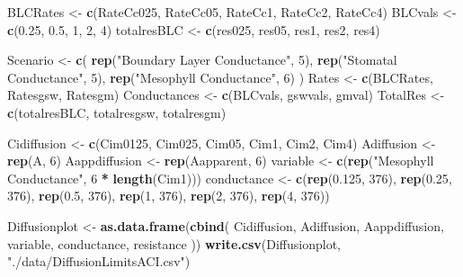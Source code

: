 \documentclass[
]{krantz}
\makeatletter
\newenvironment{Shaded}{\begin{snugshade}}{\end{snugshade}}
\newcommand{\DecValTok}[1]{\textcolor[rgb]{0.00,0.00,0.81}{#1}}
\newcommand{\FloatTok}[1]{\textcolor[rgb]{0.00,0.00,0.81}{#1}}
\newcommand{\KeywordTok}[1]{\textcolor[rgb]{0.13,0.29,0.53}{\textbf{#1}}}
\newcommand{\NormalTok}[1]{#1}
\newcommand{\OperatorTok}[1]{\textcolor[rgb]{0.81,0.36,0.00}{\textbf{#1}}}
\newcommand{\StringTok}[1]{\textcolor[rgb]{0.31,0.60,0.02}{#1}}
\newenvironment{kframe}{%
\medskip{}
\setlength{\fboxsep}{.8em}
 \def\at@end@of@kframe{}%
 \ifinner\ifhmode%
  \def\at@end@of@kframe{\end{minipage}}%
  \begin{minipage}{\columnwidth}%
 \fi\fi%
 \def\FrameCommand##1{\hskip\@totalleftmargin \hskip-\fboxsep
 \colorbox{shadecolor}{##1}\hskip-\fboxsep
     \hskip-\linewidth \hskip-\@totalleftmargin \hskip\columnwidth}%
 \MakeFramed {\advance\hsize-\width
   \@totalleftmargin\z@ \linewidth\hsize
   \@setminipage}}%
 {\par\unskip\endMakeFramed%
 \at@end@of@kframe}
\renewenvironment{Shaded}{\begin{kframe}}{\end{kframe}}
\makeatother
\begin{document}
\begin{Shaded}
\begin{Highlighting}[]
\NormalTok{BLCRates \textless{}{-}}\StringTok{ }\KeywordTok{c}\NormalTok{(RateCc025, RateCc05, RateCc1, RateCc2, RateCc4)}
\NormalTok{BLCvals \textless{}{-}}\StringTok{ }\KeywordTok{c}\NormalTok{(}\FloatTok{0.25}\NormalTok{, }\FloatTok{0.5}\NormalTok{, }\DecValTok{1}\NormalTok{, }\DecValTok{2}\NormalTok{, }\DecValTok{4}\NormalTok{)}
\NormalTok{totalresBLC \textless{}{-}}\StringTok{ }\KeywordTok{c}\NormalTok{(res025, res05, res1, res2, res4)}

\NormalTok{Scenario \textless{}{-}}
\StringTok{  }\KeywordTok{c}\NormalTok{(}
    \KeywordTok{rep}\NormalTok{(}\StringTok{"Boundary Layer Conductance"}\NormalTok{, }\DecValTok{5}\NormalTok{),}
    \KeywordTok{rep}\NormalTok{(}\StringTok{"Stomatal Conductance"}\NormalTok{, }\DecValTok{5}\NormalTok{),}
    \KeywordTok{rep}\NormalTok{(}\StringTok{"Mesophyll Conductance"}\NormalTok{, }\DecValTok{6}\NormalTok{)}
\NormalTok{  )}
\NormalTok{Rates \textless{}{-}}\StringTok{ }\KeywordTok{c}\NormalTok{(BLCRates, Ratesgsw, Ratesgm)}
\NormalTok{Conductances \textless{}{-}}\StringTok{ }\KeywordTok{c}\NormalTok{(BLCvals, gswvals, gmval)}
\NormalTok{TotalRes \textless{}{-}}\StringTok{ }\KeywordTok{c}\NormalTok{(totalresBLC, totalresgsw, totalresgm)}

\NormalTok{Cidiffusion \textless{}{-}}\StringTok{ }\KeywordTok{c}\NormalTok{(Cim0125, Cim025, Cim05, Cim1, Cim2, Cim4)}
\NormalTok{Adiffusion \textless{}{-}}\StringTok{ }\KeywordTok{rep}\NormalTok{(A, }\DecValTok{6}\NormalTok{)}
\NormalTok{Aappdiffusion \textless{}{-}}\StringTok{ }\KeywordTok{rep}\NormalTok{(Aapparent, }\DecValTok{6}\NormalTok{)}
\NormalTok{variable \textless{}{-}}\StringTok{ }\KeywordTok{c}\NormalTok{(}\KeywordTok{rep}\NormalTok{(}\StringTok{"Mesophyll Conductance"}\NormalTok{, }\DecValTok{6} \OperatorTok{*}\StringTok{ }\KeywordTok{length}\NormalTok{(Cim1)))}
\NormalTok{conductance \textless{}{-}}
\StringTok{  }\KeywordTok{c}\NormalTok{(}\KeywordTok{rep}\NormalTok{(}\FloatTok{0.125}\NormalTok{, }\DecValTok{376}\NormalTok{),}
    \KeywordTok{rep}\NormalTok{(}\FloatTok{0.25}\NormalTok{, }\DecValTok{376}\NormalTok{),}
    \KeywordTok{rep}\NormalTok{(}\FloatTok{0.5}\NormalTok{, }\DecValTok{376}\NormalTok{),}
    \KeywordTok{rep}\NormalTok{(}\DecValTok{1}\NormalTok{, }\DecValTok{376}\NormalTok{),}
    \KeywordTok{rep}\NormalTok{(}\DecValTok{2}\NormalTok{, }\DecValTok{376}\NormalTok{),}
    \KeywordTok{rep}\NormalTok{(}\DecValTok{4}\NormalTok{, }\DecValTok{376}\NormalTok{))}


\NormalTok{Diffusionplot \textless{}{-}}
\StringTok{  }\KeywordTok{as.data.frame}\NormalTok{(}\KeywordTok{cbind}\NormalTok{(}
\NormalTok{    Cidiffusion,}
\NormalTok{    Adiffusion,}
\NormalTok{    Aappdiffusion,}
\NormalTok{    variable,}
\NormalTok{    conductance,}
\NormalTok{    resistance}
\NormalTok{  ))}
\KeywordTok{write.csv}\NormalTok{(Diffusionplot, }\StringTok{"./data/DiffusionLimitsACI.csv"}\NormalTok{)}


\end{Highlighting}
\end{Shaded}
\end{document}
